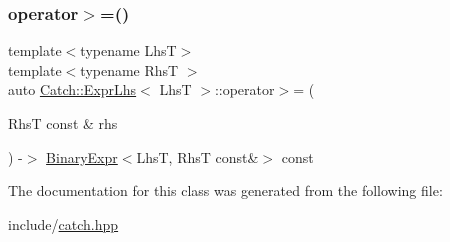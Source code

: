 \mbox{\label{classCatch_1_1ExprLhs_aff594ae5b957105c517a6257d2e730f0}} 
\subsubsection{\texorpdfstring{operator$>$=()}{operator>=()}}
{\footnotesize\ttfamily template$<$typename LhsT$>$ \\
template$<$typename RhsT $>$ \\
auto \mbox{\hyperlink{classCatch_1_1ExprLhs}{Catch\+::\+Expr\+Lhs}}$<$ LhsT $>$\+::operator$>$= (\begin{DoxyParamCaption}\item[{RhsT const \&}]{rhs }\end{DoxyParamCaption}) -\/$>$ \mbox{\hyperlink{classCatch_1_1BinaryExpr}{Binary\+Expr}}$<$LhsT, RhsT const\&$>$ const \hspace{0.3cm}{\ttfamily [inline]}}



The documentation for this class was generated from the following file\+:\begin{DoxyCompactItemize}
\item 
include/\mbox{\hyperlink{catch_8hpp}{catch.\+hpp}}\end{DoxyCompactItemize}
